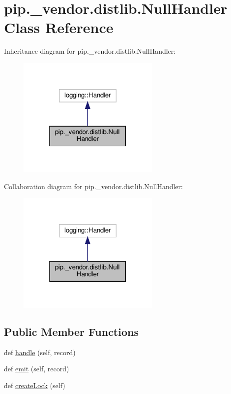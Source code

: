 \hypertarget{classpip_1_1__vendor_1_1distlib_1_1NullHandler}{}\section{pip.\+\_\+vendor.\+distlib.\+Null\+Handler Class Reference}
\label{classpip_1_1__vendor_1_1distlib_1_1NullHandler}


Inheritance diagram for pip.\+\_\+vendor.\+distlib.\+Null\+Handler\+:
\nopagebreak
\begin{figure}[H]
\begin{center}
\leavevmode
\includegraphics[width=196pt]{classpip_1_1__vendor_1_1distlib_1_1NullHandler__inherit__graph}
\end{center}
\end{figure}


Collaboration diagram for pip.\+\_\+vendor.\+distlib.\+Null\+Handler\+:
\nopagebreak
\begin{figure}[H]
\begin{center}
\leavevmode
\includegraphics[width=196pt]{classpip_1_1__vendor_1_1distlib_1_1NullHandler__coll__graph}
\end{center}
\end{figure}
\subsection*{Public Member Functions}
\begin{DoxyCompactItemize}
\item 
def \hyperlink{classpip_1_1__vendor_1_1distlib_1_1NullHandler_a94b5c4ab0f9180cfb7114c112a4b3974}{handle} (self, record)
\item 
def \hyperlink{classpip_1_1__vendor_1_1distlib_1_1NullHandler_a4e9338759d0d7d5b4908aba5acdd16ee}{emit} (self, record)
\item 
def \hyperlink{classpip_1_1__vendor_1_1distlib_1_1NullHandler_a1cb9e75ffbdd22a0f3973bba020463c5}{create\+Lock} (self)
\end{DoxyCompactItemize}
